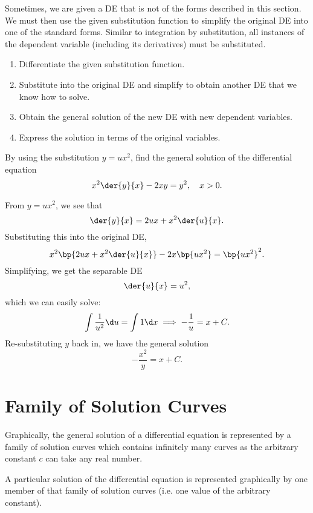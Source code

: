 Sometimes, we are given a DE that is not of the forms described in this section. We must then use the given substitution function to simplify the original DE into one of the standard forms. Similar to integration by substitution, all instances of the dependent variable (including its derivatives) must be substituted.

\begin{recipe}
    \phantom{.}
    \renewcommand{\theenumi}{\arabic{enumi}.}
    \begin{enumerate}
        \item Differentiate the given substitution function.
        \item Substitute into the original DE and simplify to obtain another DE that we know how to solve.
        \item Obtain the general solution of the new DE with new dependent variables.
        \item Express the solution in terms of the original variables.
    \end{enumerate}
    \renewcommand{\theenumi}{(\alph{enumi})}
\end{recipe}

\begin{sample}
    By using the substitution $y = ux^2$, find the general solution of the differential equation \[x^2 \der{y}{x} - 2xy = y^2, \quad x > 0.\]
\end{sample}
\begin{sampans}
    From $y = ux^2$, we see that \[\der{y}{x} = 2ux + x^2 \der{u}{x}.\] Substituting this into the original DE, \[x^2 \bp{2ux + x^2 \der{u}{x}} - 2x \bp{ux^2} = \bp{ux^2}^2.\] Simplifying, we get the separable DE \[\der{u}{x} = u^2,\] which we can easily solve: \[\int \frac1{u^2} \d u = \int 1 \d x \implies -\frac1{u} = x + C.\] Re-substituting $y$ back in, we have the general solution \[-\frac{x^2}{y} = x + C.\]
\end{sampans}

\section{Family of Solution Curves}

Graphically, the general solution of a differential equation is represented by a family of solution curves which contains infinitely many curves as the arbitrary constant $c$ can take any real number.

A particular solution of the differential equation is represented graphically by one member of that family of solution curves (i.e. one value of the arbitrary constant).

